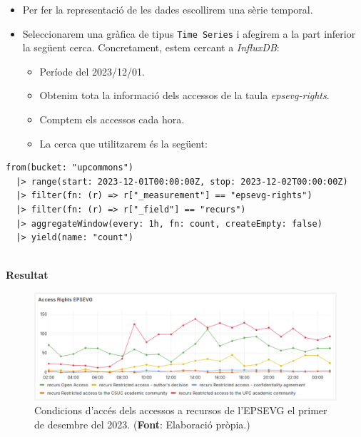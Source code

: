 \begin{itemize}
    \item Per fer la representació de les dades escollirem una sèrie temporal.
    \item Seleccionarem una gràfica de tipus \texttt{Time Series} i afegirem a la part inferior la següent cerca.
    Concretament, estem cercant a \textit{InfluxDB}:
    \begin{itemize}
        \item Període del 2023/12/01.
        \item Obtenim tota la informació dels accessos de la taula \textit{epsevg-rights}.
        \item Comptem els accessos cada hora.
        \item La cerca que utilitzarem és la següent:
    \end{itemize}
\end{itemize}

\noindent
\begin{verbatim}
from(bucket: "upcommons")
  |> range(start: 2023-12-01T00:00:00Z, stop: 2023-12-02T00:00:00Z)
  |> filter(fn: (r) => r["_measurement"] == "epsevg-rights")
  |> filter(fn: (r) => r["_field"] == "recurs")
  |> aggregateWindow(every: 1h, fn: count, createEmpty: false)
  |> yield(name: "count")
\end{verbatim}

\clearpage

\noindent \\
\textbf{Resultat}

\begin{figure}[htbp]
    \centerline{\includegraphics[width=\textwidth]{figures/access-rights-epsevg}}
    \captionsetup{justification=centering}
    \caption[Condicions d'accés dels accessos a recursos de l'EPSEVG el primer de desembre del 2023.]{Condicions d'accés dels accessos a recursos de l'EPSEVG el primer de desembre del 2023. (\textbf{Font}: Elaboració pròpia.)}\label{fig:log-access-type}
\end{figure}

